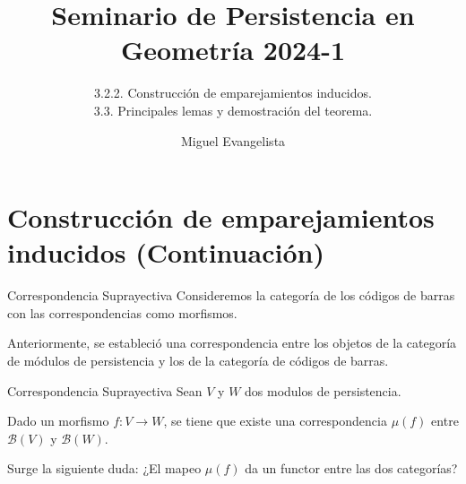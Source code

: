 \documentclass{beamer}
\title{Seminario de Persistencia en Geometría 2024-1}
\subtitle{3.2.2. Construcción de emparejamientos inducidos. \\ 3.3. Principales lemas y demostración del teorema.} %
\author{Miguel Evangelista}
\begin{document}
\frenchspacing


  \frame{\maketitle}


\section{Construcción de emparejamientos inducidos (Continuación)}

%

\begin{frame}{Correspondencia Suprayectiva}
    Consideremos la categoría de los códigos de barras con las correspondencias como morfismos.
    \newline
    \pause
    
    Anteriormente, se estableció una correspondencia entre los objetos de la categoría de módulos de persistencia y los de la categoría de códigos de barras.
    

\end{frame}

\begin{frame}{Correspondencia Suprayectiva}    
    Sean $V$ y $W$ dos modulos de persistencia.
    \newline
    \pause
    
    Dado un morfismo $f:V\to W$, se tiene que existe  una correspondencia $\mu(f)$ entre $\mathcal{B}(V)$ y $\mathcal{B}(W)$. 
    \newline 
    \pause
    
    Surge la siguiente duda: ¿El mapeo $\mu(f)$ da un functor entre las dos categorías?

\end{frame}
\end{document}
